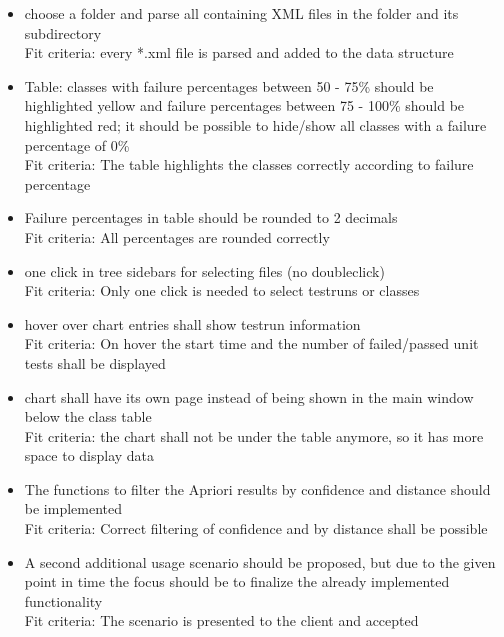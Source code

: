 \begin{itemize}

\item choose a folder and parse all containing XML files in the folder and its subdirectory\\
Fit criteria: every *.xml file is parsed and added to the data structure

\item Table: classes with failure percentages between 50 - 75\% should be highlighted yellow and failure percentages between 75 - 100\% should be highlighted red; it should be possible to hide/show all classes with a failure percentage of 0\%\\
Fit criteria: The table highlights the classes correctly according to failure percentage
\item Failure percentages in table should be rounded to 2 decimals\\
Fit criteria: All percentages are rounded correctly

\item one click in tree sidebars for selecting files (no doubleclick)\\
Fit criteria: Only one click is needed to select testruns or classes
\item hover over chart entries shall show testrun information\\
Fit criteria: On hover the start time and the number of failed/passed unit tests shall be displayed
\item chart shall have its own page instead of being shown in the main window below the class table\\
Fit criteria: the chart shall not be under the table anymore, so it has more space to display data
\item The functions to filter the Apriori results by confidence and distance should be implemented\\
Fit criteria: Correct filtering of confidence and by distance shall be possible

\item A second additional usage scenario should be proposed, but due to the given point in time the focus should be to finalize the already implemented functionality\\
Fit criteria: The scenario is presented to the client and accepted

\end{itemize}

